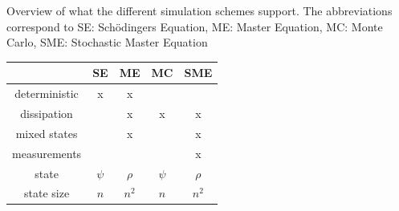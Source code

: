 \begin{margintable}[-10 cm]
    \centering
    \caption{Overview of what the different simulation schemes support. The abbreviations correspond to SE: Schödingers Equation, ME: Master Equation, MC: Monte Carlo, SME: Stochastic Master Equation}
    \vspace{0.3 cm}
    \begin{tabular}{c|c|c|c|c}
                    &  SE   & ME    & MC    & SME    \\ \hline 
    deterministic   & x     & x     &       &        \\
    dissipation     &       & x     & x     & x      \\ 
    mixed states    &       & x     &       & x      \\ 
    measurements    &       &       &       & x      \\ 
    state           & $\psi$& $\rho$&$\psi$ & $\rho$ \\
    state size      & $n$   & $n^2$ & $n$   & $n^2$
    \end{tabular}
    \label{tab:simulation_types}
\end{margintable}

